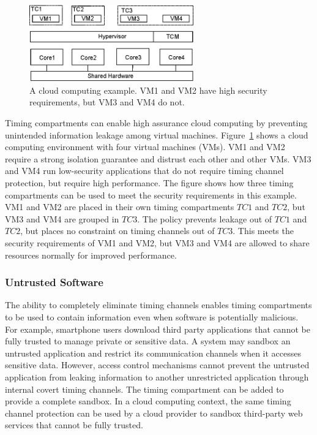 \begin{figure}
    \begin{center}
        \includegraphics[width=2.79in]{figs/cloud_tcs.eps}
        \caption{A cloud computing example. VM1 and VM2 have high security 
        requirements, but VM3 and VM4 do not.}
        \label{fig:cloud_tcs}
    \end{center}
\end{figure}

Timing compartments can enable high assurance cloud computing by preventing
unintended information leakage among virtual machines.
Figure~\ref{fig:cloud_tcs} shows a cloud computing environment with four virtual 
machines (VMs).
VM1 and VM2 require a strong isolation guarantee and distrust each other and 
other VMs.
VM3 and VM4 run low-security applications that do not require timing channel 
protection, but require high performance. The figure shows how three timing 
compartments can be used to meet the security requirements in this example.
VM1 and VM2 are placed in their own timing compartments $TC1$ and $TC2$, but VM3 
and VM4 are grouped in $TC3$. The policy prevents leakage out of $TC1$ and 
$TC2$, but places no constraint on timing channels out of $TC3$. This meets the 
security requirements of VM1 and VM2, but VM3 and VM4 are allowed to share 
resources normally for improved performance.


\subsubsection{Untrusted Software} 

The ability to completely eliminate timing channels enables timing compartments
to be used to contain information even when software is potentially malicious.
For example, smartphone users download third party applications
that cannot be fully trusted to manage private or sensitive data. A system may
sandbox an untrusted application and restrict its communication channels
when it accesses sensitive data. However, access control mechanisms cannot
prevent the untrusted application from leaking information to another 
unrestricted
application through internal covert timing channels. The timing compartment can 
be added to provide a complete sandbox.  In a cloud computing
context, the same timing channel protection can be used
by a cloud provider to sandbox third-party web services that cannot be fully 
trusted.

